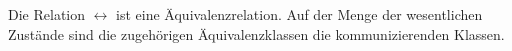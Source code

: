 Die Relation $\leftrightarrow$ ist eine Äquivalenzrelation. Auf der Menge der wesentlichen Zustände sind die zugehörigen Äquivalenzklassen die kommunizierenden Klassen.